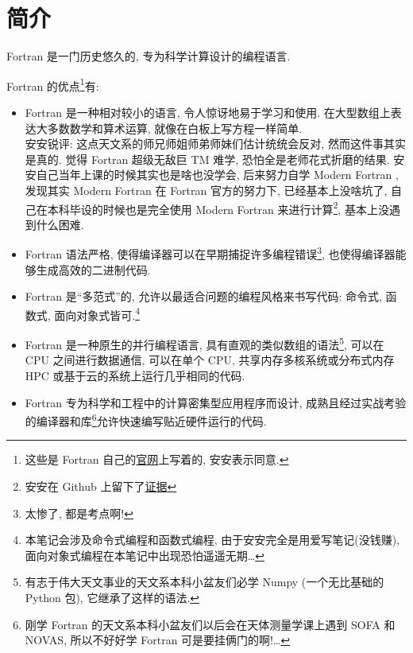 \chapter{简介}

Fortran 是一门历史悠久的, 专为科学计算设计的编程语言.

Fortran 的优点\footnote{这些是 Fortran 自己的\href{https://fortran-lang.org/}{官网}上写着的, 安安表示同意.}有:
\begin{itemize}
    \item Fortran 是一种相对较小的语言, 令人惊讶地易于学习和使用. 在大型数组上表达大多数数学和算术运算, 就像在白板上写方程一样简单.\\安安锐评: 这点天文系的师兄师姐师弟师妹们估计统统会反对, 然而这件事其实是真的. 觉得 Fortran 超级无敌巨 TM 难学, 恐怕全是老师花式折磨的结果. 安安自己当年上课的时候其实也是啥也没学会, 后来努力自学 Modern Fortran , 发现其实 Modern Fortran 在 Fortran 官方的努力下, 已经基本上没啥坑了, 自己在本科毕设的时候也是完全使用 Modern Fortran 来进行计算\footnote{安安在 Github 上留下了\href{https://github.com/GasinAn/echo1}{证据}}, 基本上没遇到什么困难.
    \item Fortran 语法严格, 使得编译器可以在早期捕捉许多编程错误\footnote{太惨了, 都是考点啊!}, 也使得编译器能够生成高效的二进制代码.
    \item Fortran 是``多范式''的, 允许以最适合问题的编程风格来书写代码: 命令式, 函数式, 面向对象式皆可.\footnote{本笔记会涉及命令式编程和函数式编程, 由于安安完全是用爱写笔记(没钱赚), 面向对象式编程在本笔记中出现恐怕遥遥无期\dots{}}
    \item Fortran 是一种原生的并行编程语言, 具有直观的类似数组的语法\footnote{有志于伟大天文事业的天文系本科小盆友们必学 Numpy (一个无比基础的 Python 包), 它继承了这样的语法.}, 可以在 CPU 之间进行数据通信, 可以在单个 CPU, 共享内存多核系统或分布式内存 HPC 或基于云的系统上运行几乎相同的代码.
    \item Fortran 专为科学和工程中的计算密集型应用程序而设计, 成熟且经过实战考验的编译器和库\footnote{刚学 Fortran 的天文系本科小盆友们以后会在天体测量学课上遇到 SOFA 和 NOVAS, 所以不好好学 Fortran 可是要挂俩门的啊!\dots{}}允许快速编写贴近硬件运行的代码.
\end{itemize}

